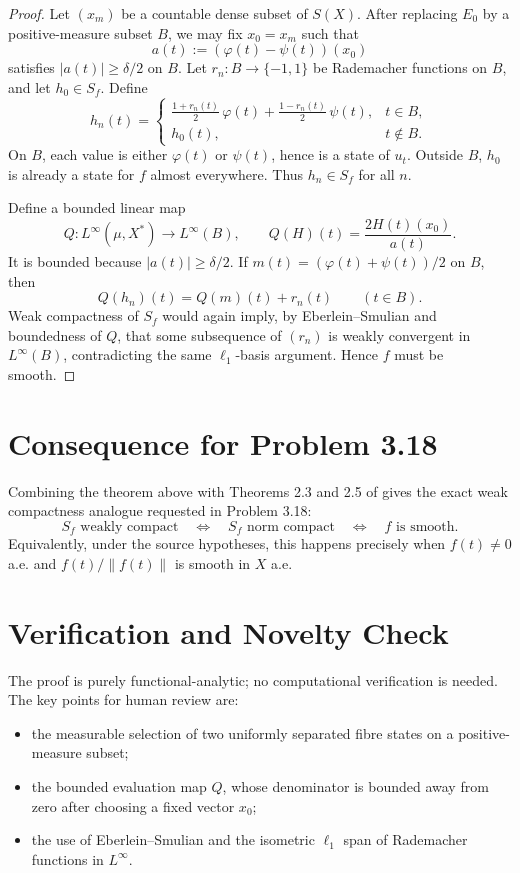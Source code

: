 \documentclass[11pt]{article}
\begin{document}
\begin{proof}
Let \((x_m)\) be a countable dense subset of \(S(X)\). After replacing
\(E_0\) by a positive-measure subset \(B\), we may fix \(x_0=x_m\) such that
\[
  a(t):=(\varphi(t)-\psi(t))(x_0)
\]
satisfies \(|a(t)|\ge \delta/2\) on \(B\). Let \(r_n:B\to\{-1,1\}\) be
Rademacher functions on \(B\), and let \(h_0\in S_f\). Define
\[
 h_n(t)=
 \begin{cases}
   \frac{1+r_n(t)}2\,\varphi(t)+\frac{1-r_n(t)}2\,\psi(t), & t\in B,\\
   h_0(t), & t\notin B.
 \end{cases}
\]
On \(B\), each value is either \(\varphi(t)\) or \(\psi(t)\), hence is a
state of \(u_t\). Outside \(B\), \(h_0\) is already a state for \(f\) almost
everywhere. Thus \(h_n\in S_f\) for all \(n\).

Define a bounded linear map
\[
  Q:L^\infty(\mu,X^*)\longrightarrow L^\infty(B),\qquad
  Q(H)(t)=\frac{2H(t)(x_0)}{a(t)}.
\]
It is bounded because \(|a(t)|\ge\delta/2\). If
\(m(t)=(\varphi(t)+\psi(t))/2\) on \(B\), then
\[
  Q(h_n)(t)=Q(m)(t)+r_n(t)\qquad(t\in B).
\]
Weak compactness of \(S_f\) would again imply, by Eberlein--Smulian and
boundedness of \(Q\), that some subsequence of \((r_n)\) is weakly convergent
in \(L^\infty(B)\), contradicting the same \(\ell_1\)-basis argument. Hence
\(f\) must be smooth.
\end{proof}

\section{Consequence for Problem 3.18}

Combining the theorem above with Theorems 2.3 and 2.5 of
\cite{DaptariDwivedi2025} gives the exact weak compactness analogue requested
in Problem 3.18:
\[
  S_f\text{ weakly compact}
  \quad\Longleftrightarrow\quad
  S_f\text{ norm compact}
  \quad\Longleftrightarrow\quad
  f\text{ is smooth}.
\]
Equivalently, under the source hypotheses, this happens precisely when
\(f(t)\ne0\) a.e. and \(f(t)/\|f(t)\|\) is smooth in \(X\) a.e.

\section{Verification and Novelty Check}

The proof is purely functional-analytic; no computational verification is
needed. The key points for human review are:
\begin{itemize}
\item the measurable selection of two uniformly separated fibre states on a
positive-measure subset;
\item the bounded evaluation map \(Q\), whose denominator is bounded away from
zero after choosing a fixed vector \(x_0\);
\item the use of Eberlein--Smulian and the isometric \(\ell_1\) span of
Rademacher functions in \(L^\infty\).
\end{itemize}
\end{document}
